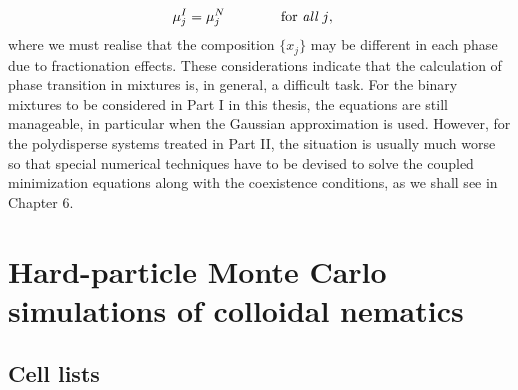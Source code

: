 {\begin{align}
\mu^{I}_{j}&=\mu^{N}_{j} \qquad\qquad \text{for {\em all} $j$},
\end{align}
where we must realise that the composition $\{x_{j}\}$ may be different in each
phase due to fractionation effects.
These considerations indicate that the calculation of phase transition in mixtures is,
in general, a difficult task. For the binary mixtures to be considered
in Part I in this thesis, the equations are still manageable, in particular when
the Gaussian approximation is used.
However, for the polydisperse systems treated in Part II,  the situation is usually much worse so that
special numerical techniques have to be devised to solve
the coupled minimization equations along with the coexistence conditions,
as we shall see in Chapter 6.
}

\section[HPMC simulations of colloidal nematics]{Hard-particle Monte Carlo simulations of colloidal nematics}

\subsection{Cell lists}

\clearpage